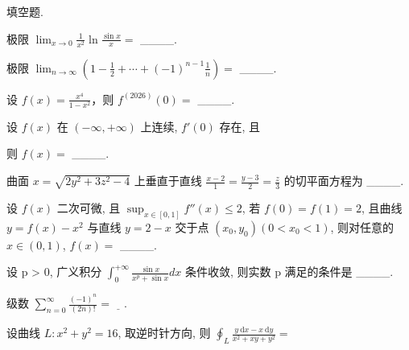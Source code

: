 \par{}
填空题.\par
极限  $\lim_{x\to0}\frac{1}{x^{2}}\ln\frac{\sin x}{x}=$  \_\_\_\_.\par
极限  $\lim_{n\to\infty}\left(1-\frac{1}{2}+\cdots+(-1)^{n-1}\frac{1}{n}\right)=$  \_\_\_\_.\par
设 $f(x) = \frac{x^4}{1 - x^2}$，则 $f^{(2026)}(0) =$ \_\_\_\_.\par
\par{}
设 $f(x)$ 在 $(- \infty, + \infty)$ 上连续, $f'(0)$ 存在, 且\par
\nopagebreak[4]
则  $f(x)=$  \_\_\_\_.\par
曲面 $x = \sqrt{2y^2 + 3z^2 - 4}$ 上垂直于直线 $\frac{x - 2}{1} = \frac{y - 3}{2} = \frac{z}{3}$ 的切平面方程为 \_\_\_\_.\par
设 $f(x)$ 二次可微, 且 $\sup_{x \in [0,1]} f''(x) \leq 2$, 若 $f(0) = f(1) = 2$, 且曲线 $y = f(x) - x^2$ 与直线 $y = 2 - x$ 交于点 $(x_0, y_0) (0 < x_0 < 1)$, 则对任意的 $x \in (0,1)$, $f(x) =$ \_\_\_\_.\par
设 p > 0, 广义积分  $\int_{0}^{+\infty}\frac{\sin x}{x^{p} + \sin x}dx$  条件收敛, 则实数 p 满足的条件是 \_\_\_\_.\par
级数 $\sum_{n=0}^{\infty} \frac{(-1)^n}{(2n)!} = \underline{\quad}$.\par
设曲线 $L: x^2 + y^2 = 16$, 取逆时针方向, 则 $\oint_{L} \frac{y \mathrm{~d}x - x \mathrm{~d}y}{x^2 + xy + y^2} =$\par
